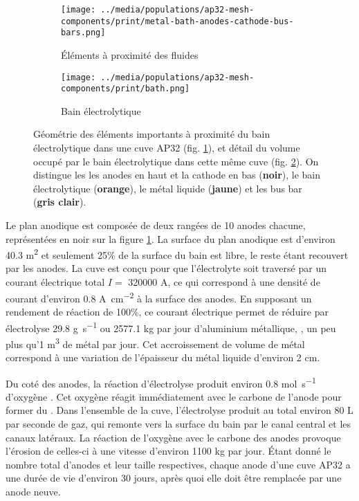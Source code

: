 \begin{figure}[t]
  \begin{center}
    \begin{subfigure}[b]{0.49\textwidth}
      \texttt{[image: ../media/populations/ap32-mesh-components/print/metal-bath-anodes-cathode-bus-bars.png]}
      \caption{Éléments à proximité des fluides}
      \label{fig:ap32-geometry-elements}
    \end{subfigure}
%
    \begin{subfigure}[b]{0.49\textwidth}
      \texttt{[image: ../media/populations/ap32-mesh-components/print/bath.png]}
      \caption{Bain électrolytique}
      \label{fig:ap32-geometry-electrolyte}
    \end{subfigure}
%
    \caption{Géométrie des éléments importants à proximité
      du bain électrolytique dans une cuve AP32
      (fig. \ref{fig:ap32-geometry-elements}), et détail du volume
      occupé par le bain électrolytique dans cette même cuve
      (fig. \ref{fig:ap32-geometry-electrolyte}). On distingue les
      les anodes en haut et la cathode
      en bas (\textbf{noir}), le bain électrolytique
      (\textbf{orange}), le métal liquide (\textbf{jaune}) et les
      bus bar (\textbf{gris clair}).}
    \label{fig:ap32-geometry}
  \end{center}
\end{figure}

Le plan anodique est composée de deux rangées de 10 anodes chacune,
représentées en noir sur la figure \ref{fig:ap32-geometry-elements}. La
surface du plan anodique est d'environ \num{40.3} \si{\square\meter}
et seulement \num{25}\% de la surface du bain est libre, le reste
étant recouvert par les anodes. La cuve est conçu pour que
l'électrolyte soit traversé par un courant électrique total $I = $
\num{320000} \si{\ampere}, ce qui correspond à une densité de courant
d'environ \num{0.8} \si{\ampere\per\square\centi\meter} à la surface
des anodes. En supposant un rendement de réaction de \num{100}\%, ce
courant électrique permet de réduire par électrolyse \num{29.8}
\si{\gram\per\second} ou \num{2577.1} \si{\kilo\gram} par jour
d'aluminium métallique, \ie, un peu plus qu'\num{1} \si{\cubic\meter}
de métal par jour. Cet accroissement de volume de métal correspond à
une variation de l'épaisseur du métal liquide d'environ \num{2}
\si{\centi\meter}.

Du coté des anodes, la réaction d'électrolyse produit environ
\num{0.8} \si{\mol\per\second} d'oxygène . Cet oxygène réagit
immédiatement avec le carbone de l'anode pour former du . Dans
l'ensemble de la cuve, l'électrolyse produit au total environ \num{80}
\si{\liter} par seconde de gaz, qui remonte vers la surface du bain
par le canal central et les canaux latéraux. La réaction de l'oxygène
avec le carbone des anodes provoque l'érosion de celles-ci à une
vitesse d'environ \num{1100} \si{\kilo\gram} par jour. Étant donné le
nombre total d'anodes et leur taille respectives, chaque anode d'une
cuve AP32 a une durée de vie d'environ 30 jours, après quoi elle doit
être remplacée par une anode neuve.

